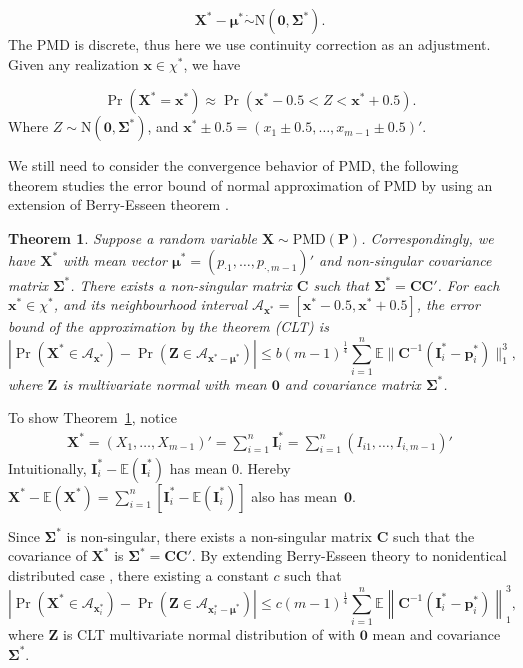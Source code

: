 \documentclass[12pt]{article}
\newcommand{\zerovec}{{\boldsymbol{0}}}
\newcommand{\Ivec}{{\boldsymbol{I}}}
\newcommand{\EE}{\mathbb{E}}
\newcommand{\Cmat}{\mathbf{C}}
\newcommand{\Pmat}{\mathbf{P}}
\newcommand{\pvec}{\boldsymbol{p}}
\newcommand{\N}{\textrm{N}}
\newcommand{\PMD}{\textrm{PMD}}
\newcommand{\Xvec}{\boldsymbol{X}}
\newcommand{\Zvec}{\boldsymbol{Z}}
\newcommand{\xvec}{\boldsymbol{x}}
\newcommand{\muvec}{\boldsymbol{\mu}}
\newcommand{\Sig}{\boldsymbol{\Sigma}}
\newcommand{\mvec}{\boldsymbol{\mu}}
\newtheorem{thm}{Theorem}
\begin{document}
$$\Xvec^{\ast} - \muvec^{\ast} \dot\sim \N\left(\zerovec, \Sig^{\ast}\right).$$
The $\PMD$ is discrete, thus here we use continuity correction as an adjustment. Given any realization $\xvec \in \chi^{\ast}$, we have

$$\Pr \left( \Xvec^{\ast} = \xvec^{\ast} \right) \approx \Pr \left( \xvec^{\ast} - 0.5 < Z < \xvec^{\ast} + 0.5 \right).$$
Where $Z \sim \N \left(\zerovec, \Sig^{\ast}\right)$, and $\xvec^{\ast}\pm0.5 = (x_1\pm0.5, \dots, x_{m-1}\pm0.5)'.$


We still need to consider the convergence behavior of $\PMD$, the following theorem studies the error bound of normal approximation of $\PMD$ by using an extension of Berry-Esseen theorem .
\begin{thm} \label{thm:normal}
Suppose a random variable $\Xvec \sim \PMD(\Pmat)$. Correspondingly, we have $\Xvec^{\ast}$ with mean vector $\mvec^{\ast} = \left( p_{\cdot1} ,\dots,p_{\cdot,m-1}\right)'$ and non-singular covariance matrix $\Sig^{\ast}$. There exists a non-singular matrix $\Cmat$ such that $\Sig^{\ast} = \Cmat\Cmat'$. For each $\xvec^{\ast}\in \chi^{\ast}$, and its neighbourhood interval $\mathcal{A}_{\xvec^{\ast}} = [\xvec^{\ast}-0.5, \xvec^{\ast}+0.5]$, the error bound of the approximation by the theorem (CLT) is
\begin{equation*}
    |\Pr(\Xvec^{\ast} \in \mathcal{A}_{\xvec^{\ast}}) - \Pr(\Zvec \in \mathcal{A}_{\xvec^{\ast}-\mvec^{\ast}})| \leq b (m-1)^{\frac{1}{4}} \sum_{i=1}^{n}\EE\|\Cmat^{-1}(\Ivec_{i}^{\ast}-\pvec_{i}^{\ast})\|_1^3,
\end{equation*}
where $\Zvec$ is multivariate normal with mean $\zerovec$ and covariance matrix $\Sig^{\ast}$.
\end{thm}
To show Theorem~\ref{thm:normal}, notice
\begin{align*}
    \Xvec^{\ast} = (X_1,\dots,X_{m-1})' = \sum_{i=1}^{n} \Ivec_{i}^{\ast}= \sum_{i=1}^{n} (I_{i1},\dots,I_{i,m-1})'
\end{align*}
Intuitionally, $\Ivec_i^{\ast} - \EE(\Ivec_i^{\ast})$ has mean 0. Hereby $\Xvec^{\ast} - \EE (\Xvec^{\ast}) = \sum_{i=1}^{n} [\Ivec_i^{\ast} - \EE (\Ivec_{i}^{\ast})]$ also has mean~$\zerovec$.

Since $\Sig^{\ast}$ is non-singular, there exists a non-singular matrix $\Cmat$ such that the covariance of $\Xvec^{\ast}$ is $\Sig^{\ast} = \Cmat\Cmat'$. By extending Berry-Esseen theory to nonidentical distributed case \cite{article}, there existing  a constant $c$ such that
\begin{equation*}
    |\Pr\left(\Xvec^{\ast} \in \mathcal{A}_{\xvec_i^{\ast}}\right) - \Pr\left(\Zvec \in \mathcal{A}_{\xvec_i^{\ast}-\muvec^{\ast}} \right)| \leq c(m-1)^{\frac{1}{4}}\sum_{i=1}^{n} \EE \left\|\Cmat^{-1}(\Ivec_{i}^{\ast}-\pvec_{i}^{\ast})\right\|_1^3,
\end{equation*}
where $\Zvec$ is CLT multivariate normal distribution of with $\zerovec$ mean and covariance $\Sig^{\ast}$.
\end{document}
